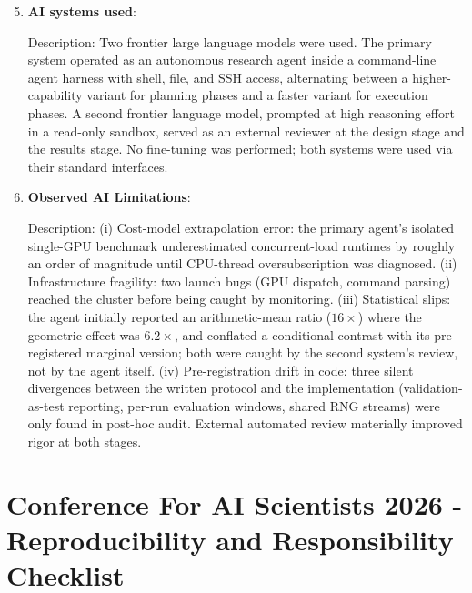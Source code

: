 \begin{enumerate}
    \setcounter{enumi}{4}

    \item \textbf{AI systems used}:

    Description: Two frontier large language models were used. The primary system operated as an autonomous research agent inside a command-line agent harness with shell, file, and SSH access, alternating between a higher-capability variant for planning phases and a faster variant for execution phases. A second frontier language model, prompted at high reasoning effort in a read-only sandbox, served as an external reviewer at the design stage and the results stage. No fine-tuning was performed; both systems were used via their standard interfaces.

    \item \textbf{Observed AI Limitations}:

    Description: (i) Cost-model extrapolation error: the primary agent's isolated single-GPU benchmark underestimated concurrent-load runtimes by roughly an order of magnitude until CPU-thread oversubscription was diagnosed. (ii) Infrastructure fragility: two launch bugs (GPU dispatch, command parsing) reached the cluster before being caught by monitoring. (iii) Statistical slips: the agent initially reported an arithmetic-mean ratio ($16\times$) where the geometric effect was $6.2\times$, and conflated a conditional contrast with its pre-registered marginal version; both were caught by the second system's review, not by the agent itself. (iv) Pre-registration drift in code: three silent divergences between the written protocol and the implementation (validation-as-test reporting, per-run evaluation windows, shared RNG streams) were only found in post-hoc audit. External automated review materially improved rigor at both stages.

\end{enumerate}

\newpage

\section*{Conference For AI Scientists 2026 - Reproducibility and Responsibility Checklist}
\label{checklist_reproducibility}

